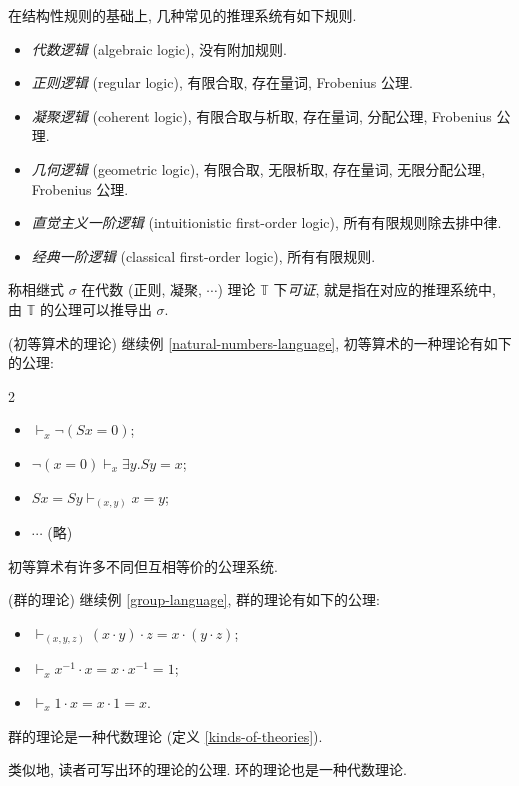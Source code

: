 \begin{definition}
	{}
	在结构性规则的基础上, 几种常见的推理系统有如下规则.
	\begin{itemize}
		\item \emph{代数逻辑} (algebraic logic), 没有附加规则.
		\item \emph{正则逻辑} (regular logic), 有限合取, 存在量词, Frobenius 公理.
		\item \emph{凝聚逻辑} (coherent logic), 有限合取与析取, 存在量词, 分配公理, Frobenius 公理.
		\item \emph{几何逻辑} (geometric logic), 有限合取, 无限析取, 存在量词, 无限分配公理, Frobenius 公理.
		\item \emph{直觉主义一阶逻辑} (intuitionistic first-order logic), 所有有限规则除去排中律.
		\item \emph{经典一阶逻辑} (classical first-order logic), 所有有限规则.
	\end{itemize}
\end{definition}

\begin{definition}
	{}
	称相继式 $\sigma$ 在代数 (正则, 凝聚, $\cdots$) 理论 $\mathbb T$ 下\emph{可证},
	就是指在对应的推理系统中, 由 $\mathbb T$ 的公理可以推导出 $\sigma$.
\end{definition}

\begin{example}
	{(初等算术的理论)}
	继续例 \ref{natural-numbers-language}, 初等算术的一种理论有如下的公理:
	\begin{multicols*}
		{2}
		\begin{itemize}
			\item $\vdash_x \neg (Sx=0)$;
			\item $\neg(x=0) \vdash_{x} \exists y. Sy=x$;
			\item $Sx=Sy\vdash_{(x,y)} x=y$;
			\item $\cdots$ (略)
		\end{itemize}
	\end{multicols*}
	
	初等算术有许多不同但互相等价的公理系统.
\end{example}

\begin{example}
	{(群的理论)}
	继续例 \ref{group-language}, 群的理论有如下的公理:
	\begin{itemize}
		\item $\vdash_{(x,y,z)}(x\cdot y)\cdot z = x\cdot (y\cdot z)$;
		\item $\vdash_x x^{-1}\cdot x = x\cdot x^{-1} = 1$;
		\item $\vdash_x 1\cdot x = x\cdot 1 = x$.
	\end{itemize}
	群的理论是一种代数理论 (定义 \ref{kinds-of-theories}).
	
	类似地, 读者可写出环的理论的公理. 环的理论也是一种代数理论.
\end{example}


